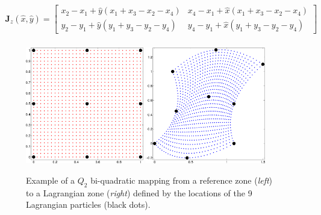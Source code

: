\begin{eqnarray}\label{eq:Q1Jacobian}
\mathbf{J}_z(\hat x,\hat y)=\left[
\begin{array}{cc}
 x_2 - x_1 + \hat y(x_1 + x_3 - x_2 - x_4) & x_4 - x_1 + \hat x(x_1 + x_3 - x_2 - x_4) \\
 y_2 - y_1 + \hat y(y_1 + y_3 - y_2 - y_4) & y_4 - y_1 + \hat x(y_1 + y_3 - y_2 - y_4)
\end{array} \right] \nonumber \\
\end{eqnarray}

\begin{figure}[htbp]
\centering
  \includegraphics*[height=2.0in,keepaspectratio=true]{./Figures/Q2_Element_Ref.png}
  \hspace{8mm}
  \raisebox{0.95in}{{\Huge $\mathbf \longmapsto$}}
  \hspace{8mm}
  \includegraphics*[height=2.0in,keepaspectratio=true]{./Figures/Q2_Element_Phys.png}
  \caption{Example of a $Q_2$ bi-quadratic mapping from a reference zone
          (\emph{left}) to a Lagrangian zone (\emph{right}) defined by
          the locations of the 9 Lagrangian particles
          (black dots).
  \label{fig:JacMapping}}
\end{figure}

